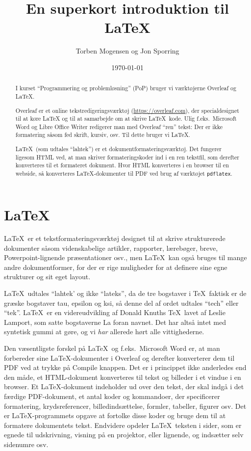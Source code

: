 \documentclass[a4paper]{report}
\title{En superkort introduktion til \LaTeX}
\author{Torben Mogensen og Jon Sporring}
\date{\today}
\begin{document}
\maketitle

\begin{abstract}
I kurset ``Programmering og problemløsning'' (PoP) bruger vi
værktøjerne Overleaf og \LaTeX.

Overleaf er et online tekstredigeringsværktøj
(\url{https://overleaf.com}), der specialdesignet til at køre \LaTeX
og til at samarbejde om at skrive \LaTeX\ kode.  Ulig f.eks.\ Microsoft
Word og Libre Office Writer redigerer man med Overleaf ``ren'' tekst:
Der er ikke formatering såsom fed skrift, kursiv, osv.  Til dette
bruger vi \LaTeX.

\LaTeX\ (som udtales ``lahtek'') er et dokumentformateringsværktøj.
Det fungerer ligesom HTML ved, at man skriver formateringskoder ind i
en ren tekstfil, som derefter konverteres til et formateret dokument.
Hvor HTML konverteres i en browser til en webside, så konverteres
\LaTeX-dokumenter til PDF ved brug af værktøjet \texttt{pdflatex}.
\end{abstract}

\tableofcontents

\chapter{\LaTeX}

\LaTeX\ er et tekstformateringsværktøj designet til at skrive
strukturerede dokumenter såsom videnskabelige artikler, rapporter,
lærebøger, breve, Powerpoint-lignende præsentationer osv., men
\LaTeX\ kan også bruges til mange andre dokumentformer, for der er
rige muligheder for at definere sine egne strukturer og sit eget
layout.

\LaTeX\ udtales ``lahtek' og ikke ``lateks'', da de tre bogstaver i
\TeX\ faktisk er de græske bogstaver tau, epsilon og ksi, så denne del
af ordet udtales ``tech'' eller ``tek''. \LaTeX\ er en videreudvikling
af Donald Knuths \TeX\ lavet af Leslie Lamport, som satte bogstaverne
\textsf{La} foran navnet.  Det har altså intet med syntetisk gummi at
gøre, og vi \emph{har} allerede hørt alle vittighederne.

Den væsentligste forskel på \LaTeX\ og f.eks.~Microsoft Word er, at
man forbereder sine \LaTeX-dokumenter i Overleaf og derefter
konverterer dem til PDF ved at trykke på Compile knappen.  Det er i
princippet ikke anderledes end den måde, et HTML-dokument konverteres
til tekst og billeder i et vindue i en browser.  Et \LaTeX-dokument
indeholder ud over den tekst, der skal indgå i det færdige
PDF-dokument, et antal koder og kommandoer, der specificerer
formatering, krydsreferencer, billedindsættelse, formler, tabeller,
figurer osv.  Det er \LaTeX-programmets opgave at fortolke disse koder
og bruge dem til at formatere dokumentets tekst.  Endvidere opdeler
\LaTeX\ teksten i sider, som er egnede til udskrivning, visning på en
projektor, eller lignende, og indsætter selv sidenumre osv.
\end{document}
